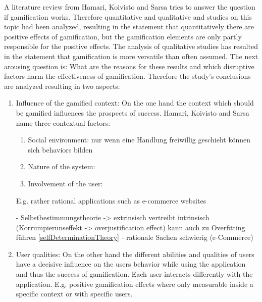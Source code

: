A literature review from Hamari, Koivisto and Sarsa tries to answer the question if gamification works. Therefore quantitative and qualitative and studies on this topic had been analyzed, resulting in the statement that quantitatively there are positive effects of gamification, but the gamification elements are only partly responsible for the positive effects. The analysis of qualitative studies has resulted in the statement that gamification is more versatile than often assumed. The next arousing question is: What are the reasons for these results and which disruptive factors harm the effectiveness of gamification. Therefore the study's conclusions are analyzed resulting in two aspects:
\begin{enumerate}
	\item Influence of the gamified context: \newline
	On the one hand the context which should be gamified influences the prospects of success.  Hamari, Koivisto and Sarsa name three contextual factors:
	\begin{enumerate}
		\item Social environment: \newline
		nur wenn eine Handlung freiwillig geschieht können sich behaviors bilden
		\item Nature of the system: \newline
		
		\item Involvement of the user: \newline
		
	\end{enumerate}
	
	E.g. rather rational applications such as e-commerce websites  
	
	
	- Selbstbestimmungstheorie -> extrinsisch vertreibt intrinsisch (Korrumpierunseffekt -> overjustification effect)
	kann auch zu Overfitting führen
	\ref{selfDeterminationTheory}
	- rationale Sachen schwierig (e-Commerce)
	
	
	
	\item User qualities: \newline
	On the other hand the different abilities and qualities of users have a decisive influence on the users behavior while using the application and thus the success of gamification. Each user interacts differently with the application. E.g. positive gamification effects where only measurable inside a specific context or with specific users.
\end{enumerate}

\cite[p. 3029, 3030]{hamariDoesGamificationWork2014}


\newpage
